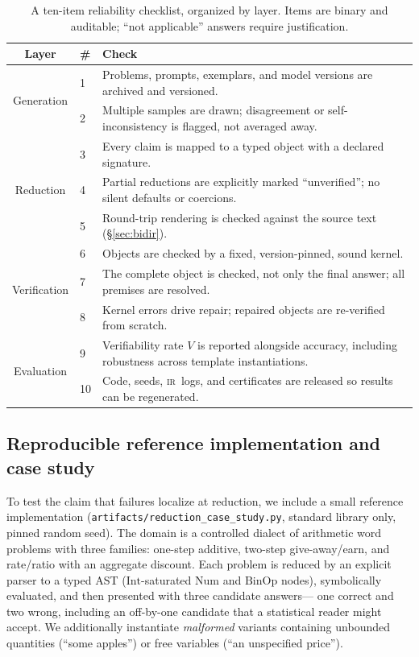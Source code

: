 \documentclass[11pt,a4paper]{article}
\newcommand{\ir}{\textsc{ir}\xspace}
\theoremstyle{plain}
\theoremstyle{definition}
\theoremstyle{remark}
\begin{document}
\begin{table}[t]
\centering
\caption{A ten-item reliability checklist, organized by layer. Items are
binary and auditable; ``not applicable'' answers require justification.}
\label{tab:checklist}
\small
\begin{tabular}{@{}clp{8.6cm}@{}}
\toprule
\textbf{Layer} & \textbf{\#} & \textbf{Check}\\
\midrule
\multirow{2}{*}{Generation}
 & 1 & Problems, prompts, exemplars, and model versions are archived and versioned.\\
 & 2 & Multiple samples are drawn; disagreement or self-inconsistency is flagged, not averaged away.\\
\multirow{3}{*}{Reduction}
 & 3 & Every claim is mapped to a typed object with a declared signature.\\
 & 4 & Partial reductions are explicitly marked ``unverified''; no silent defaults or coercions.\\
 & 5 & Round-trip rendering is checked against the source text (\S\ref{sec:bidir}).\\
\multirow{3}{*}{Verification}
 & 6 & Objects are checked by a fixed, version-pinned, sound kernel.\\
 & 7 & The complete object is checked, not only the final answer; all premises are resolved.\\
 & 8 & Kernel errors drive repair; repaired objects are re-verified from scratch.\\
\multirow{2}{*}{Evaluation}
 & 9 & Verifiability rate $V$ is reported alongside accuracy, including robustness across template instantiations.\\
 & 10 & Code, seeds, \ir\ logs, and certificates are released so results can be regenerated.\\
\bottomrule
\end{tabular}
\end{table}

\subsection{Reproducible reference implementation and case study}\label{sec:casestudy}
To test the claim that failures localize at reduction, we include a small
reference implementation (\texttt{artifacts/reduction\_case\_study.py},
standard library only, pinned random seed). The domain is a controlled
dialect of arithmetic word problems with three families: one-step additive,
two-step give-away/earn, and rate/ratio with an aggregate discount. Each
problem is reduced by an explicit parser to a typed AST
($\mathrm{Int}$-saturated $\mathrm{Num}$ and $\mathrm{BinOp}$ nodes),
symbolically evaluated, and then presented with three candidate answers---
one correct and two wrong, including an off-by-one candidate that a
statistical reader might accept. We additionally instantiate
\emph{malformed} variants containing unbounded quantities
(``some apples'') or free variables (``an unspecified price'').
\end{document}
